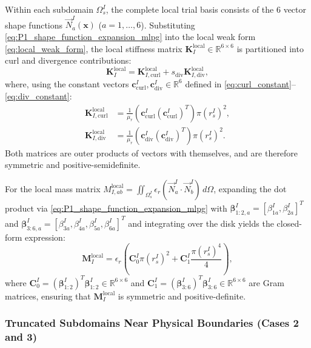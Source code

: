 \documentclass[VANCOUVER]{USG}
\begin{document}
Within each subdomain $\Omega_s^I$, the complete local trial basis consists of the 6 vector shape functions $\vec{N}_a^I(\mathbf{x})$ ($a=1,\dots,6$). Substituting \eqref{eq:P1_shape_function_expansion_mlpg} into the local weak form \eqref{eq:local_weak_form}, the local stiffness matrix $\mathbf{K}_I^{\mathrm{local}} \in \mathbb{R}^{6 \times 6}$ is partitioned into curl and divergence contributions:
\begin{equation}
    \mathbf{K}_I^{\mathrm{local}} = \mathbf{K}_{I, \mathrm{curl}}^{\mathrm{local}} + s_{\mathrm{div}} \mathbf{K}_{I, \mathrm{div}}^{\mathrm{local}},
\end{equation}
where, using the constant vectors $\mathbf{c}_{\mathrm{curl}}^I, \mathbf{c}_{\mathrm{div}}^I \in \mathbb{R}^6$ defined in \eqref{eq:curl_constant}--\eqref{eq:div_constant}:
\begin{align}
    \mathbf{K}_{I, \mathrm{curl}}^{\mathrm{local}} & = \frac{1}{\mu_r} \left( \mathbf{c}_{\mathrm{curl}}^I (\mathbf{c}_{\mathrm{curl}}^I)^T \right) \pi (r_s^I)^2, \label{eq:k_curl_analytic} \\
    \mathbf{K}_{I, \mathrm{div}}^{\mathrm{local}}  & = \frac{1}{\mu_r} \left( \mathbf{c}_{\mathrm{div}}^I (\mathbf{c}_{\mathrm{div}}^I)^T \right) \pi (r_s^I)^2. \label{eq:k_div_analytic}
\end{align}
Both matrices are outer products of vectors with themselves, and are therefore symmetric and positive-semidefinite.

For the local mass matrix $M_{I, ab}^{\mathrm{local}} = \iint_{\Omega_s^I} \epsilon_r (\vec{N}_a^I \cdot \vec{N}_b^I) \, d\Omega$, expanding the dot product via \eqref{eq:P1_shape_function_expansion_mlpg} with $\boldsymbol{\beta}_{1:2, a}^I = [\beta_{1a}^I, \beta_{2a}^I]^T$ and $\boldsymbol{\beta}_{3:6, a}^I = [\beta_{3a}^I, \beta_{4a}^I, \beta_{5a}^I, \beta_{6a}^I]^T$ and integrating over the disk yields the closed-form expression:
\begin{equation}
    \mathbf{M}_I^{\mathrm{local}} = \epsilon_r \left( \mathbf{C}_0^I \pi (r_s^I)^2 + \mathbf{C}_1^I \frac{\pi (r_s^I)^4}{4} \right),
    \label{eq:m_local_analytic}
\end{equation}
where $\mathbf{C}_0^I = (\boldsymbol{\beta}_{1:2}^I)^T \boldsymbol{\beta}_{1:2}^I \in \mathbb{R}^{6 \times 6}$ and $\mathbf{C}_1^I = (\boldsymbol{\beta}_{3:6}^I)^T \boldsymbol{\beta}_{3:6}^I \in \mathbb{R}^{6 \times 6}$ are Gram matrices, ensuring that $\mathbf{M}_I^{\mathrm{local}}$ is symmetric and positive-definite.

\subsubsection{Truncated Subdomains Near Physical Boundaries (Cases 2 and 3)}
\label{subsubsec:truncated_subdomains_analytic}
\end{document}
